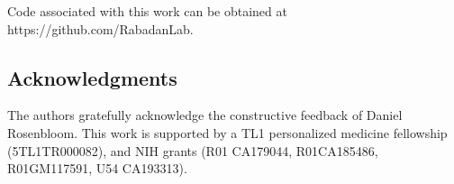 \documentclass[a4paper,11pt]{article}
\begin{document}
\par

Code associated with this work can be obtained at https://github.com/RabadanLab.


\subsection*{Acknowledgments}

The authors gratefully acknowledge the constructive feedback of Daniel Rosenbloom.
This work is supported by a TL1 personalized medicine fellowship (5TL1TR000082), and NIH grants (R01 CA179044, R01CA185486, R01GM117591, U54 CA193313).




\end{document}
